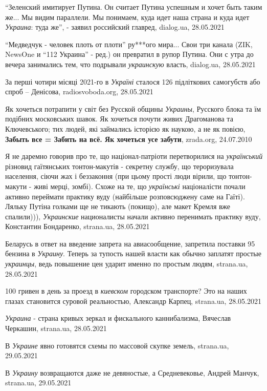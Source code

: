 \enquote{Зеленский имитирует Путина. Он считает Путина успешным и хочет быть таким же...
Мы видим параллели. Мы понимаем, куда идет наша страна и куда идет
\emph{Украина}: туда же}, - заявил российский главред, dialog.ua, 28.05.2021

\enquote{Медведчук - человек плоть от плоти} ру***ого мира... Свои три канала
(ZIK, NewsOne и \enquote{112 Украина} - ред.) он превратил в рупор Путина. Они
с утра до вечера занимались тем, что подрывали \emph{украинскую} власть,
dialog.ua, 28.05.2021

За перші чотири місяці 2021-го в \emph{Україні} сталося 126 підліткових
самогубств або спроб – Денісова, radiosvoboda.org, 28.05.2021

Як хочеться потрапити у світ без Русской общины \emph{Украины}, Русского блока
та їм подібних московських шавок.  Як хочеться почути живих Драгоманова та
Ключевського; тих людей, які займались історією як наукою, а не як повією,
\textbf{Забыть все = Забить на всё. Як хочеться усе забути}, zrada.org,
24.07.2010

Я не даремно говорив про те, що націонал-патріоти перетворилися на
\emph{український} різновид гаїтянських тонтон-макутів - секретну службу, що
тероризувала населення, сіючи жах і беззаконня (при цьому прості люди вірили,
що тонтон-макути - живі мерці, зомбі).  Схоже на те, що \emph{українські}
націоналісти почали активно переймати практику вуду (найбільше розповсюджену
саме на Гаїті).  Ляльку Путіна голками ще не тикають (покищо), але макет Кремля
вже спалили))), \emph{Украинские} националисты начали активно перенимать
практику вуду, Константин Бондаренко, strana.ua, 28.05.2021

Беларусь в ответ на введение запрета на авиасообщение, запретила поставки 95
бензина в \emph{Украину}. Теперь за тупость нашей власти как обычно заплатят
простые \emph{украинцы}, ведь повышение цен ударит именно по простым людям,
strana.ua, 28.05.2021

100 гривен в день за проезд в \emph{киевском} городском транспорте?  Это на
наших глазах становится суровой реальностью, Александр Карпец, strana.ua,
28.05.2021

\emph{Украина} - страна кривых зеркал и фискального каннибализма, Вячеслав
Черкашин, strana.ua, 28.05.2021

В \emph{Украине} явно готовятся схемы по массовой скупке земель, strana.ua,
29.05.2021

В \emph{Украину} возвращаются даже не девяностые, а Средневековье, Андрей
Манчук, strana.ua, 29.05.2021

